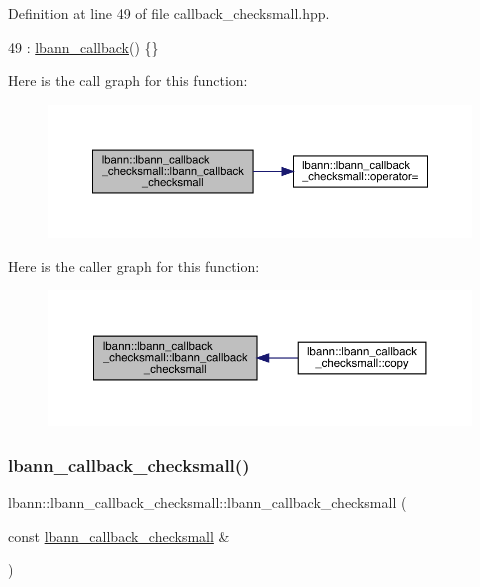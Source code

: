 Definition at line 49 of file callback\+\_\+checksmall.\+hpp.


\begin{DoxyCode}
49 : \hyperlink{classlbann_1_1lbann__callback_a679057298a41ddd47f08c157f756c584}{lbann\_callback}() \{\}
\end{DoxyCode}
Here is the call graph for this function\+:\nopagebreak
\begin{figure}[H]
\begin{center}
\leavevmode
\includegraphics[width=350pt]{classlbann_1_1lbann__callback__checksmall_a2a5769a9309807f6952212d5ea3a4466_cgraph}
\end{center}
\end{figure}
Here is the caller graph for this function\+:\nopagebreak
\begin{figure}[H]
\begin{center}
\leavevmode
\includegraphics[width=350pt]{classlbann_1_1lbann__callback__checksmall_a2a5769a9309807f6952212d5ea3a4466_icgraph}
\end{center}
\end{figure}
\mbox{\label{classlbann_1_1lbann__callback__checksmall_a8e08286cc2ded6e47297f76fcdbf8f32}} 
\subsubsection{\texorpdfstring{lbann\+\_\+callback\+\_\+checksmall()}{lbann\_callback\_checksmall()}\hspace{0.1cm}{\footnotesize\ttfamily [2/2]}}
{\footnotesize\ttfamily lbann\+::lbann\+\_\+callback\+\_\+checksmall\+::lbann\+\_\+callback\+\_\+checksmall (\begin{DoxyParamCaption}\item[{const \hyperlink{classlbann_1_1lbann__callback__checksmall}{lbann\+\_\+callback\+\_\+checksmall} \&}]{ }\end{DoxyParamCaption})\hspace{0.3cm}{\ttfamily [default]}}



